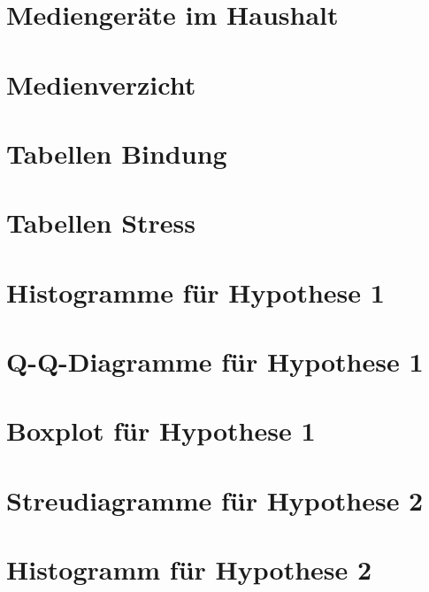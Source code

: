 \section{Mediengeräte im Haushalt}\label{app:Mediengeräte}

\newpage

\section{Medienverzicht}\label{app:Medienverzicht}

\newpage

\section{Tabellen Bindung}\label{app:TablesAas}

\newpage

\section{Tabellen Stress}\label{app:TablesPsq}

\newpage

\section{Histogramme für Hypothese 1}\label{app:Hypo1_Histogramme}

\newpage
\section{Q-Q-Diagramme für Hypothese 1}\label{app:Hypo1_QQDiagramme}

\newpage
\section{Boxplot für Hypothese 1}\label{app:Hypo1_Boxplot}

\newpage
\section{Streudiagramme für Hypothese 2}\label{app:Hypo2_Streudiagramm}

\newpage
\section{Histogramm für Hypothese 2}\label{app:Hypo2_Histogramm}

\newpage
